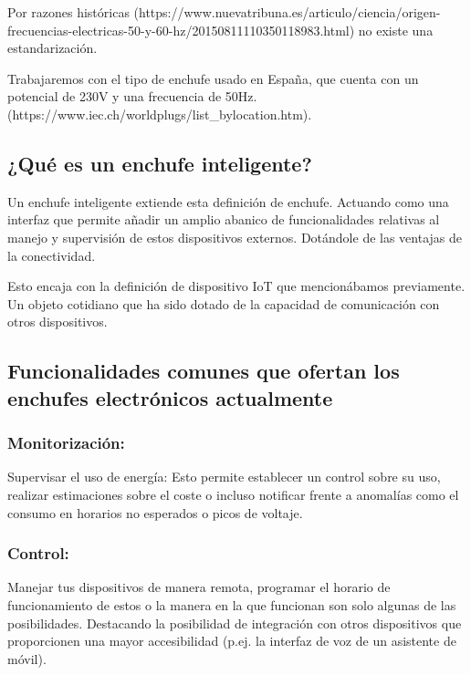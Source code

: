 \documentclass[a4paper,10pt]{article}
\begin{document}
Por razones históricas
(https://www.nuevatribuna.es/articulo/ciencia/origen-frecuencias-electricas-50-y-60-hz/20150811110350118983.html)
no existe una estandarización.

Trabajaremos con el tipo de enchufe usado en España, que cuenta con un
potencial de 230V y una frecuencia de 50Hz.
(https://www.iec.ch/worldplugs/list\_bylocation.htm).

\subsection{¿Qué es un enchufe
inteligente?}\label{quuxe9-es-un-enchufe-inteligente}

Un enchufe inteligente extiende esta definición de enchufe. Actuando
como una interfaz que permite añadir un amplio abanico de
funcionalidades relativas al manejo y supervisión de estos dispositivos
externos. Dotándole de las ventajas de la conectividad.

Esto encaja con la definición de dispositivo IoT que mencionábamos
previamente. Un objeto cotidiano que ha sido dotado de la capacidad de
comunicación con otros dispositivos.

\subsection{Funcionalidades comunes que ofertan los enchufes
electrónicos
actualmente}\label{funcionalidades-comunes-que-ofertan-los-enchufes-electruxf3nicos-actualmente}

\subsubsection{Monitorización:}\label{monitorizaciuxf3n}

Supervisar el uso de energía: Esto permite establecer un control sobre
su uso, realizar estimaciones sobre el coste o incluso notificar frente
a anomalías como el consumo en horarios no esperados o picos de voltaje.

\subsubsection{Control:}\label{control}

Manejar tus dispositivos de manera remota, programar el horario de
funcionamiento de estos o la manera en la que funcionan son solo algunas
de las posibilidades. Destacando la posibilidad de integración con otros
dispositivos que proporcionen una mayor accesibilidad (p.ej. la interfaz
de voz de un asistente de móvil).
\end{document}
